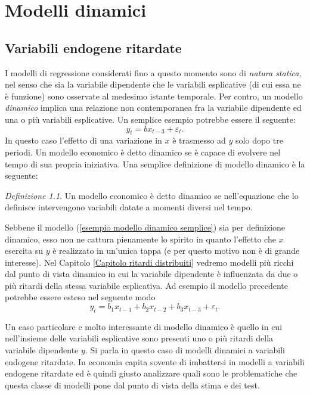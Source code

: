 \documentclass[a4paper]{report}
\newcounter{ese}
\newcounter{def}
\theoremstyle{remark}
\newtheorem{definizione}[def]{Definizione}
\newcounter{theor}
\begin{document}
\part{Modelli dinamici}

\chapter{Variabili endogene ritardate}

I modelli di regressione considerati fino a questo momento sono di \emph{%
natura statica}, nel senso che sia la variabile dipendente che le variabili
esplicative (di cui essa ne \`{e} funzione) sono osservate al medesimo
istante temporale. Per contro, un modello \emph{dinamico} implica una
relazione non contemporanea fra la variabile dipendente ed una o pi\`{u}
variabili esplicative. Un semplice esempio potrebbe essere il seguente:%
\begin{equation}
y_{t}=bx_{t-3}+\varepsilon _{t}.  \label{esempio modello dinamico semplice}
\end{equation}%
In questo caso l'effetto di una variazione in $x$ \`{e} trasmesso ad $y$
solo dopo tre periodi. Un modello economico \`{e} detto dinamico se \`{e}
capace di evolvere nel tempo di sua propria iniziativa. Una semplice
definizione di modello dinamico \`{e} la seguente:

\begin{definizione}
Un modello economico \`{e} detto dinamico se nell'equazione che lo definisce
intervengono variabili datate a momenti diversi nel tempo.
\end{definizione}

Sebbene il modello (\ref{esempio modello dinamico semplice}) sia per
definizione dinamico, esso non ne cattura pienamente lo spirito in quanto
l'effetto che $x$ esercita su $y$ \`{e} realizzato in un'unica tappa (e per
questo motivo non \`{e} di grande interesse). Nel Capitolo \ref{Capitolo
ritardi distribuiti} vedremo modelli pi\`{u} ricchi dal punto di vista
dinamico in cui la variabile dipendente \`{e} influenzata da due o pi\`{u}
ritardi della stessa variabile esplicativa. Ad esempio il modello precedente
potrebbe essere esteso nel seguente modo%
\begin{equation*}
y_{t}=b_{1}x_{t-1}+b_{2}x_{t-2}+b_{3}x_{t-3}+\varepsilon _{t}.
\end{equation*}

Un caso particolare e molto interessante di modello dinamico \`{e} quello in
cui nell'insieme delle variabili esplicative sono presenti uno o pi\`{u}
ritardi della variabile dipendente $y$. Si parla in questo caso di modelli
dinamici a variabili endogene ritardate. In economia capita sovente di
imbattersi in modelli a variabili endogene ritardate ed \`{e} quindi giusto
analizzare quali sono le problematiche che questa classe di modelli pone dal
punto di vista della stima e dei test.
\end{document}
